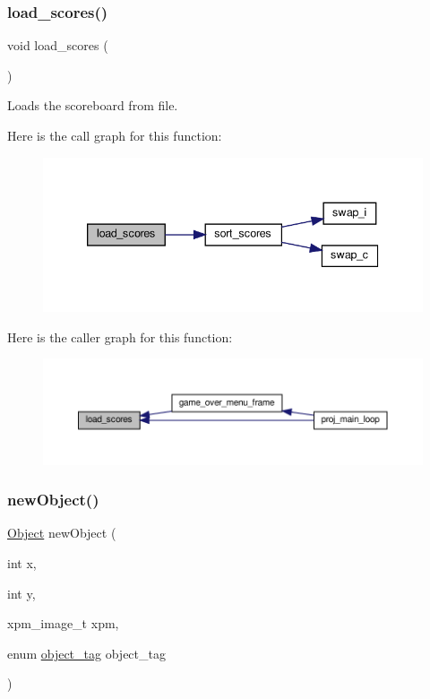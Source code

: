 \subsubsection{\texorpdfstring{load\+\_\+scores()}{load\_scores()}}
{\footnotesize\ttfamily void load\+\_\+scores (\begin{DoxyParamCaption}{ }\end{DoxyParamCaption})}



Loads the scoreboard from file. 

Here is the call graph for this function\+:\nopagebreak
\begin{figure}[H]
\begin{center}
\leavevmode
\includegraphics[width=339pt]{group__utils_ga1214184725b2f89d6ae427ecd9041295_cgraph}
\end{center}
\end{figure}
Here is the caller graph for this function\+:\nopagebreak
\begin{figure}[H]
\begin{center}
\leavevmode
\includegraphics[width=350pt]{group__utils_ga1214184725b2f89d6ae427ecd9041295_icgraph}
\end{center}
\end{figure}
\mbox{\label{group__utils_gad24d82cbacfb1bf3af2491088d770602}} 
\subsubsection{\texorpdfstring{new\+Object()}{newObject()}}
{\footnotesize\ttfamily \hyperlink{structObject}{Object} new\+Object (\begin{DoxyParamCaption}\item[{int}]{x,  }\item[{int}]{y,  }\item[{xpm\+\_\+image\+\_\+t}]{xpm,  }\item[{enum \hyperlink{group__utils_ga3eff9ebd9f241e211e00b991e2ac60fc}{object\+\_\+tag}}]{object\+\_\+tag }\end{DoxyParamCaption})}



